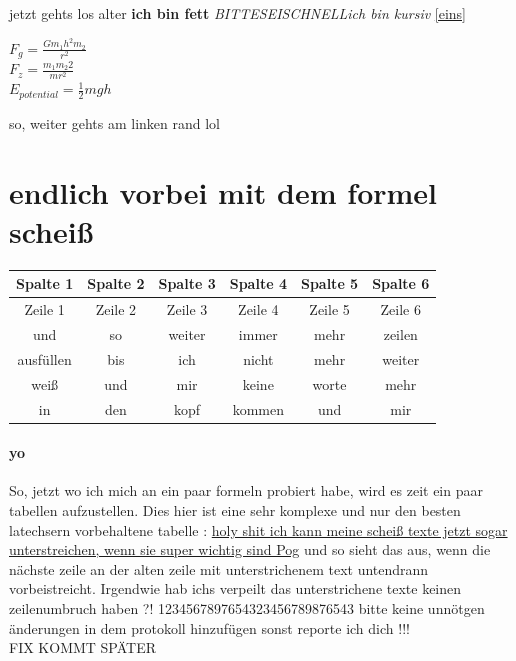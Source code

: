 \documentclass[a4paper]{scrartcl}
\begin{document}
				jetzt gehts los alter \textbf{ich bin fett}
				\emph{BITTESEISCHNELL}\textit{ich bin kursiv}
				\ref{eins}
				\linebreak[3]
				\\ \begin{center} \huge ${F}_{g}=\frac{G{m}_{1}h^2{m}_{2}}{{r}^{2}}$
				\linebreak[5]
				\\ {\color{red}${F}_{z}=\frac{{m}_{1}{m}_{2}{2}}{{}{m r}^{2}}$}
				\linebreak[5]
				\\$E_{potential}=\frac{{1}}{2}mgh$
				\linebreak[10]
				
				\end{center}
			
			so, weiter gehts am linken rand lol
		
		\section{endlich vorbei mit dem formel scheiß}
		\begin{tabular}{||c||c||c||c||c||c|}
	
			\hline 
			Spalte 1  & Spalte 2 & Spalte 3 & Spalte 4 & Spalte 5 & Spalte 6 \\ 
			\hline 
			Zeile 1  & Zeile 2  & Zeile 3  & Zeile 4 & Zeile 5 & Zeile 6 \\ 
			\hline 
			und  & so  & weiter  & immer  & mehr  & zeilen  \\ 
			\hline 
			ausfüllen & bis  & ich  & nicht  & mehr  & weiter \\ 
			\hline 
			weiß  & und  & mir  & keine  & worte  & mehr \\ 
			\hline 
			in  & den & kopf  & kommen  & und  & mir \\ 
			\hline
		\end{tabular} 
		
		\paragraph{yo}
		So, jetzt wo ich mich an ein paar formeln probiert habe, wird es zeit ein paar tabellen aufzustellen. Dies hier ist eine sehr komplexe und nur den besten latechsern vorbehaltene tabelle :
		\underline{holy shit ich kann meine scheiß texte jetzt sogar unterstreichen, wenn sie super wichtig sind Pog} und so sieht das aus, wenn die nächste zeile an der alten zeile mit
		 unterstrichenem text untendrann vorbeistreicht. Irgendwie hab ichs verpeilt das unterstrichene texte keinen zeilenumbruch haben ?!  1234567897654323456789876543 
		 \huge bitte keine unnötgen änderungen in dem protokoll hinzufügen sonst reporte ich dich !!!
		 \vspace{20pt}
		  \\ {\huge FIX KOMMT SPÄTER }
		
\end{document}

